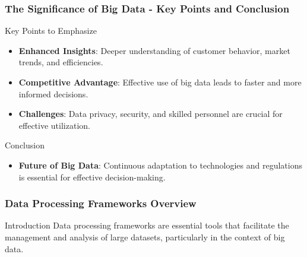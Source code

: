 \documentclass{beamer}
\begin{document}
\begin{frame}[fragile]
    \frametitle{The Significance of Big Data - Key Points and Conclusion}
    \begin{block}{Key Points to Emphasize}
        \begin{itemize}
            \item \textbf{Enhanced Insights}: Deeper understanding of customer behavior, market trends, and efficiencies.
            \item \textbf{Competitive Advantage}: Effective use of big data leads to faster and more informed decisions.
            \item \textbf{Challenges}: Data privacy, security, and skilled personnel are crucial for effective utilization.
        \end{itemize}
    \end{block}
    \begin{block}{Conclusion}
        \begin{itemize}
            \item \textbf{Future of Big Data}: Continuous adaptation to technologies and regulations is essential for effective decision-making.
        \end{itemize}
    \end{block}
\end{frame}

\begin{frame}
    \frametitle{Data Processing Frameworks Overview}
    \begin{block}{Introduction}
        Data processing frameworks are essential tools that facilitate the management and analysis of large datasets, particularly in the context of big data.
    \end{block}
\end{frame}
\end{document}
